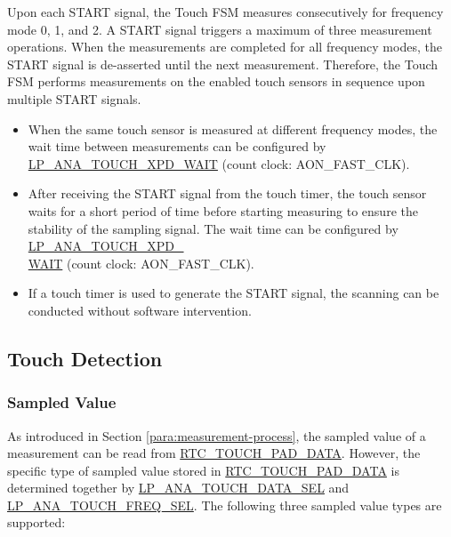 \documentclass[main\_\_EN.tex]{subfiles}
\begin{document}
Upon each START signal, the Touch FSM measures consecutively for frequency mode 0, 1, and 2. A START signal triggers a maximum of three measurement operations. When the measurements are completed for all frequency modes, the START signal is de-asserted until the next measurement. Therefore, the Touch FSM performs measurements on the enabled touch sensors in sequence upon multiple START signals. 

\begin{tiplisting}
    \vspace{-2em}
    \begin{itemize}
        \item When the same touch sensor is measured at different frequency modes, the wait time between measurements can be configured by \hyperref[fielddesc:LPANATOUCHXPDWAIT]{LP\_ANA\_TOUCH\_XPD\_WAIT} (count clock: AON\_FAST\_CLK).
        \item After receiving the START signal from the touch timer, the touch sensor waits for a short period of time before starting measuring to ensure the stability of the sampling signal. The wait time can be configured by \hyperref[fielddesc:LPANATOUCHXPDWAIT]{LP\_ANA\_TOUCH\_XPD\_\\WAIT} (count clock: AON\_FAST\_CLK).
        \item If a touch timer is used to generate the START signal, the scanning can be conducted without software intervention.
    \end{itemize}
\end{tiplisting}

\subsection{Touch Detection}

\subsubsection{Sampled Value}
\label{para:sampled-value}

As introduced in Section \ref{para:measurement-process}, the sampled value of a measurement can be read from \hyperref[fielddesc:RTCTOUCHPAD0DATA]{RTC\_TOUCH\_PAD\_DATA}. However, the specific type of sampled value stored in \hyperref[fielddesc:RTCTOUCHPAD0DATA]{RTC\_TOUCH\_PAD\_DATA} is determined together by \hyperref[fielddesc:LPANATOUCHDATASEL]{LP\_ANA\_TOUCH\_DATA\_SEL} and \hyperref[fielddesc:LPANATOUCHFREQSEL]{LP\_ANA\_TOUCH\_FREQ\_SEL}. The following three sampled value types are supported:
\end{document}
